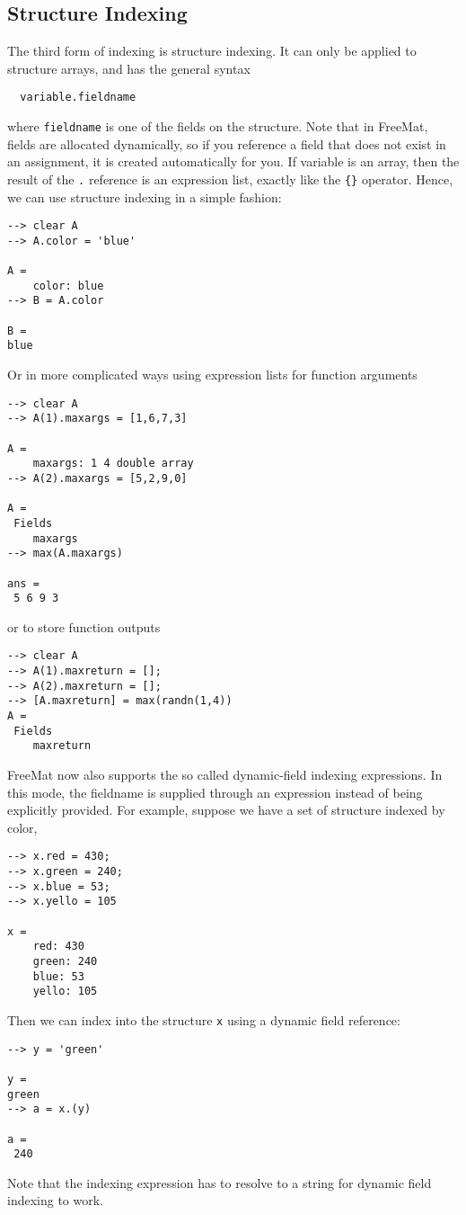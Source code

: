 \subsection{Structure Indexing}

The third form of indexing is structure indexing.  It can only
be applied to structure arrays, and has the general syntax
\begin{verbatim}
  variable.fieldname
\end{verbatim}
where \verb|fieldname| is one of the fields on the structure.  Note that
in FreeMat, fields are allocated dynamically, so if you reference
a field that does not exist in an assignment, it is created automatically
for you.  If variable is an array, then the result of the \verb|.| 
reference is an expression list, exactly like the \verb|{}| operator.  Hence,
we can use structure indexing in a simple fashion:
\begin{verbatim}
--> clear A
--> A.color = 'blue'

A = 
    color: blue
--> B = A.color

B = 
blue
\end{verbatim}
Or in more complicated ways using expression lists for function arguments
\begin{verbatim}
--> clear A
--> A(1).maxargs = [1,6,7,3]

A = 
    maxargs: 1 4 double array
--> A(2).maxargs = [5,2,9,0]

A = 
 Fields
    maxargs
--> max(A.maxargs)

ans = 
 5 6 9 3 
\end{verbatim}
or to store function outputs
\begin{verbatim}
--> clear A
--> A(1).maxreturn = [];
--> A(2).maxreturn = [];
--> [A.maxreturn] = max(randn(1,4))
A = 
 Fields
    maxreturn
\end{verbatim}
FreeMat now also supports the so called dynamic-field indexing 
expressions.  In this mode, the fieldname is supplied through 
an expression instead of being explicitly provided.  For example,
suppose we have a set of structure indexed by color,
\begin{verbatim}
--> x.red = 430;
--> x.green = 240;
--> x.blue = 53;
--> x.yello = 105

x = 
    red: 430
    green: 240
    blue: 53
    yello: 105
\end{verbatim}
Then we can index into the structure \verb|x| using a dynamic field
reference:
\begin{verbatim}
--> y = 'green'

y = 
green
--> a = x.(y)

a = 
 240 
\end{verbatim}
Note that the indexing expression has to resolve to a string for
dynamic field indexing to work.
